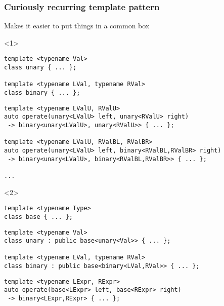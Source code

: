 \documentclass[14pt,a4paper,dvipsnames,usenames]{beamer}
\begin{document}
\begin{frame}[fragile]
  \frametitle{Curiously recurring template pattern}

  Makes it easier to put things in a common box
  \vspace{.2cm}
  
  \begin{overlayarea}{\textwidth}{6.5cm}
  \begin{onlyenv}<1>
  \begin{lstlisting}[basicstyle=\ttfamily\fontsize{8pt}{8pt}\selectfont]
template <typename Val>
class unary { ... };

template <typename LVal, typename RVal>
class binary { ... };
  \end{lstlisting}
  \begin{lstlisting}[basicstyle=\ttfamily\fontsize{8pt}{8pt}\selectfont,morekeywords={unary,binary}]
template <typename LValU, RValU>
auto operate(unary<LValU> left, unary<RValU> right)
 -> binary<unary<LValU>, unary<RValU>> { ... };

template <typename LValU, RValBL, RValBR>
auto operate(unary<LValU> left, binary<RValBL,RValBR> right)
 -> binary<unary<LValU>, binary<RValBL,RValBR>> { ... };

...
  \end{lstlisting}
  \end{onlyenv}

  \begin{onlyenv}<2>
  \begin{lstlisting}[basicstyle=\ttfamily\fontsize{8pt}{8pt}\selectfont]
template <typename Type>
class base { ... };
  \end{lstlisting}
  \begin{lstlisting}[basicstyle=\ttfamily\fontsize{8pt}{8pt}\selectfont,morekeywords={base}]
template <typename Val>
class unary : public base<unary<Val>> { ... };

template <typename LVal, typename RVal>
class binary : public base<binary<LVal,RVal>> { ... };
  \end{lstlisting}
  \begin{lstlisting}[basicstyle=\ttfamily\fontsize{8pt}{8pt}\selectfont,morekeywords={base,unary,binary}]
template <typename LExpr, RExpr>
auto operate(base<LExpr> left, base<RExpr> right)
 -> binary<LExpr,RExpr> { ... };
  \end{lstlisting}
  \end{onlyenv}
  \end{overlayarea}



\end{frame}
\end{document}

